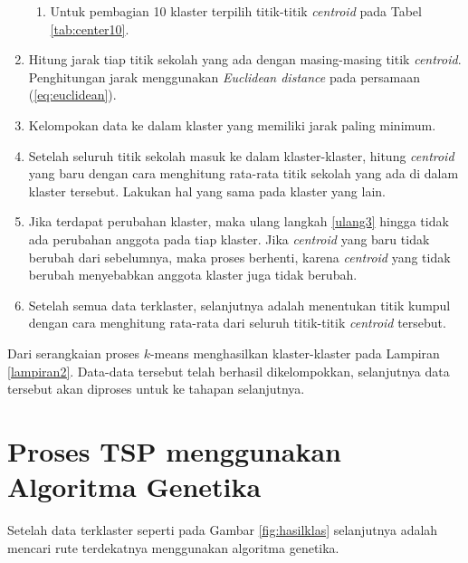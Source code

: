 \begin{enumerate}
\begin{enumerate}


	\item Untuk pembagian 10 klaster terpilih titik-titik \textit{centroid} pada Tabel \ref{tab:center10}.
	

		
	\end{enumerate}

	\item \label{ulang3} Hitung jarak tiap titik sekolah yang ada dengan masing-masing titik \textit{centroid}. Penghitungan jarak menggunakan \textit{Euclidean distance} pada persamaan (\ref{eq:euclidean}).
	
	\item Kelompokan data ke dalam klaster yang memiliki jarak paling minimum.
	\item Setelah seluruh titik sekolah masuk ke dalam klaster-klaster, hitung \textit{centroid} yang baru dengan cara menghitung rata-rata titik sekolah yang ada di dalam klaster tersebut. Lakukan hal yang sama pada klaster yang lain.
	\item Jika terdapat perubahan klaster, maka ulang langkah \ref{ulang3} hingga tidak ada perubahan anggota pada tiap klaster. Jika \textit{centroid} yang baru tidak berubah dari sebelumnya, maka proses berhenti, karena \textit{centroid} yang tidak berubah menyebabkan anggota klaster juga tidak berubah.
	
	\item Setelah semua data terklaster, selanjutnya adalah menentukan titik kumpul dengan cara menghitung rata-rata dari seluruh titik-titik \textit{centroid} tersebut.
\end{enumerate}

Dari serangkaian proses $k$-means menghasilkan klaster-klaster pada Lampiran \ref{lampiran2}. Data-data tersebut telah berhasil dikelompokkan, selanjutnya data tersebut akan diproses untuk ke tahapan selanjutnya.

\section{Proses TSP menggunakan Algoritma Genetika}

Setelah data terklaster seperti pada Gambar \ref{fig:hasilklas} selanjutnya adalah mencari rute terdekatnya menggunakan algoritma genetika.

